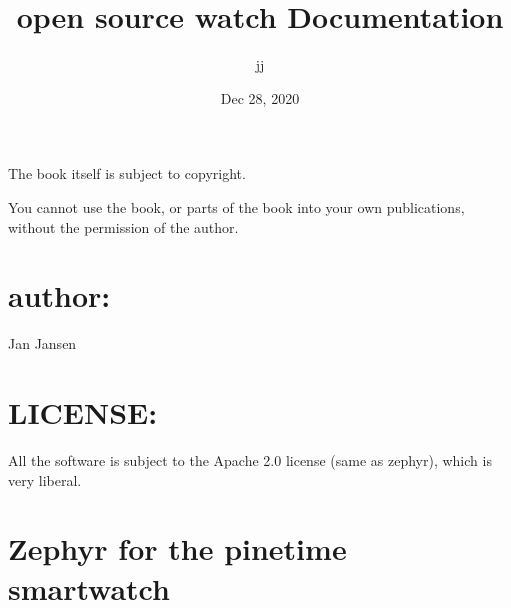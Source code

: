 \documentclass[letterpaper,10pt,english]{sphinxmanual}
\title{open source watch Documentation}
\date{Dec 28, 2020}
\author{jj}
\begin{document}
\pagestyle{empty}
\sphinxmaketitle
\pagestyle{plain}
\sphinxtableofcontents
\pagestyle{normal}
\label{\detokenize{index::doc}}
\noindent{}




The book itself is subject to copyright.

You cannot use the book, or parts of the book into your own publications, without the permission of the author.


\chapter{author:}
\label{\detokenize{copyright:author}}
Jan Jansen


\chapter{LICENSE:}
\label{\detokenize{copyright:license}}
All the software is subject to the Apache 2.0 license (same as zephyr), which is very liberal.


\chapter{Zephyr for the pinetime smartwatch}
\label{\detokenize{content:zephyr-for-the-pinetime-smartwatch}}\label{\detokenize{content::doc}}
\begin{sphinxVerbatim}[commandchars=\\\{\}]
           


           
\end{sphinxVerbatim}
\end{document}
